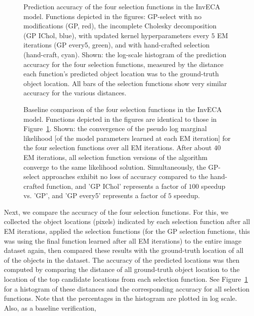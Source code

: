 \documentclass[12pt]{article}
\begin{document}
\begin{figure}[ht!]
\centering
\caption{Prediction accuracy of the four selection functions in the InvECA model.
Functions depicted in the figures: GP-select with no modifications (GP, red), the incomplete Cholesky decomposition (GP IChol, blue), with updated kernel hyperparameters every $5$ EM iterations (GP every5, green), and with hand-crafted selection (hand-craft, cyan).
Shown: the log-scale histogram of the prediction accuracy for the four selection functions, measured by the distance each function's predicted object location was to the ground-truth object location. 
All bars of the selection functions show very similar accuracy for the various distances. 
}
\label{fig:inveca1}
\end{figure}
\begin{figure}[ht!]
\centering
\caption{Baseline comparison of the four selection functions in the InvECA model.
Functions depicted in the figures are identical to those in Figure~\ref{fig:inveca1}.
Shown: the convergence of the pseudo log marginal likelihood [of the model parameters learned at each EM iteration] for the four selection functions over all EM iterations. After about $40$ EM iterations, all selection function versions of the algorithm converge to the same likelihood solution.  
Simultaneously, the GP-select approaches exhibit no loss of accuracy compared to the hand-crafted function,  and 
'GP IChol' represents a factor of $100$ speedup vs. 'GP', and 'GP every5' represents a factor of $5$ speedup.
}
\label{fig:inveca2}
\end{figure}
%
Next, we compare the accuracy of the four selection functions.
For this, we collected the object locations (pixels) indicated by each selection function after all EM iterations, 
applied the selection functions (for the GP selection functions, this was using the final function learned after all EM iterations) to the entire image dataset again, 
then compared these results with the ground-truth location of all of the objects in the dataset.
The accuracy of the predicted locations was then computed by comparing the distance of all ground-truth object location to the location of the top candidate locations from each selection function. 
 See Figure~\ref{fig:inveca1} for a histogram of these distances and the corresponding accuracy for all selection functions. Note that the percentages in the histogram are plotted in log scale.
%
Also, as a baseline verification, 
\end{document}
